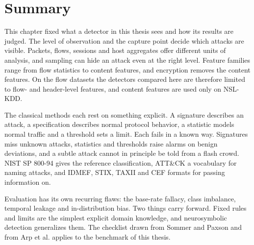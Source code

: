 \section{Summary}
\label{sec:ch2-summary}

This chapter fixed what a detector in this thesis sees and how its results
are judged. The level of observation and the capture point decide which
attacks are visible. Packets, flows, sessions and host aggregates offer
different units of analysis, and sampling can hide an attack even at the
right level. Feature families range from flow statistics to content features,
and encryption removes the content features. On the flow datasets the
detectors compared here are therefore limited to flow- and header-level features, and content features are used only on
NSL-KDD.

The classical methods each rest on something explicit. A signature describes
an attack, a specification describes normal protocol behavior, a statistic
models normal traffic and a threshold sets a limit. Each fails in a known
way. Signatures miss unknown attacks, statistics and thresholds raise alarms
on benign deviations, and a subtle attack cannot in principle be told from a
flash crowd. NIST SP 800-94 gives the reference classification, ATT\&CK a
vocabulary for naming attacks, and IDMEF, STIX, TAXII and CEF formats for
passing information on.

Evaluation has its own recurring flaws: the base-rate fallacy, class
imbalance, temporal leakage and in-distribution bias. Two things carry
forward. Fixed rules and limits are the simplest explicit domain knowledge,
and neurosymbolic detection generalizes them. The checklist drawn from
Sommer and Paxson and from Arp et al. applies to the benchmark of this
thesis.

